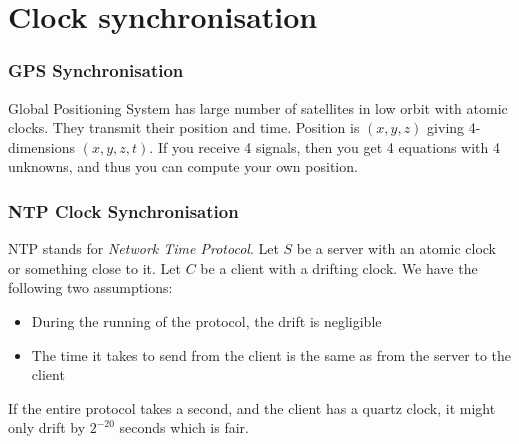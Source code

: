 \documentclass[14pt]{beamer}
\begin{document}
\section{Clock synchronisation}
        \begin{frame}
            \frametitle{GPS Synchronisation}
                Global Positioning System has large number of satellites in low orbit with atomic clocks. They transmit their position and time. Position is $(x, y, z)$ giving 4-dimensions $(x, y, z, t)$. If you receive 4 signals, then you get 4 equations with 4 unknowns, and thus you can compute your own position. 
        \end{frame}
        \begin{frame}
            \frametitle{NTP Clock Synchronisation}
                NTP stands for \textit{Network Time Protocol}. Let $S$ be a server with an atomic clock or something close to it. Let $C$ be a client with a drifting clock. We have the following two assumptions:
                \begin{itemize}
                    \item During the running of the protocol, the drift is negligible
                    \item The time it takes to send from the client is the same as from the server to the client
                \end{itemize}
                If the entire protocol takes a second, and the client has a quartz clock, it might only drift by $2^{-20}$ seconds which is fair. 
        \end{frame}
\end{document}
